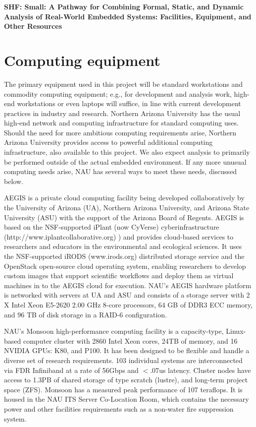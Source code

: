 \documentclass[12pt]{article}
\begin{document}
\begin{center}
{\Large\sf\textbf{SHF: Small: A Pathway for Combining Formal, Static, and
  Dynamic Analysis of Real-World Embedded Systems: Facilities, Equipment, and Other Resources}}
\end{center}

\section*{Computing equipment}

The primary equipment used in this project will be standard workstations and commodity computing equipment; e.g., for development and analysis work, high-end workstations or even laptops will suffice, in line with current development practices in industry and research. Northern Arizona University has the usual high-end network and computing infrastructure for standard computing uses.  Should the need for more ambitious computing requirements arise, Northern Arizona University provides access to powerful additional computing infrastructure, also available to this project.  We also expect analysis to primarily be performed outside of the actual embedded environment.  If any more unusual computing needs arise, NAU has several ways to meet these needs, discussed below.

AEGIS is a private cloud computing facility being developed collaboratively by the University of Arizona (UA), Northern Arizona University, and Arizona State University (ASU) with the support of the Arizona Board of Regents. AEGIS is based on the NSF-supported iPlant (now CyVerse) cyberinfrastructure (http://www.iplantcollaborative.org) ) and provides cloud-based services to researchers and educators in the environmental and ecological sciences. It uses the NSF-supported iRODS (www.irods.org) distributed storage service and the OpenStack open-source cloud operating system, enabling researchers to develop custom images that support scientific workflows and deploy them as virtual machines in to the AEGIS cloud for execution. NAU’s AEGIS hardware platform is networked with servers at UA and ASU and consists of a storage server with 2 X Intel Xeon E5-2620 2.00 GHz 8-core processors, 64 GB of DDR3 ECC memory, and 96 TB of disk storage in a RAID-6 configuration.

NAU’s Monsoon high-performance computing facility is a capacity-type, Linux-based computer cluster with 2860 Intel Xeon cores, 24TB of memory, and 16 NVIDIA GPUs: K80, and P100. It has been designed to be flexible and handle a diverse set of research requirements. 103 individual systems are interconnected via FDR Infiniband at a rate of 56Gbps and $<.07$us latency. Cluster nodes have access to 1.3PB of shared storage of type scratch (lustre), and long-term project space (ZFS). Monsoon has a measured peak performance of 107 teraflops. It is housed in the NAU ITS Server Co-Location Room, which contains the necessary power and other facilities requirements such as a non-water fire suppression system.
\end{document}
